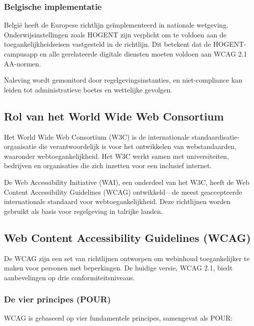 \subsubsection{Belgische implementatie}

België heeft de Europese richtlijn geïmplementeerd in nationale wetgeving. Onderwijsinstellingen zoals HOGENT zijn verplicht om te voldoen aan de toegankelijkheidseisen vastgesteld in de richtlijn. Dit betekent dat de HOGENT-campusapp en alle gerelateerde digitale diensten moeten voldoen aan WCAG 2.1 AA-normen. \autocite{BelgianWebAccessibility2025, Vlaanderen_WCAG_nodate}

Naleving wordt gemonitord door regelgevingsinstanties, en niet-compliance kan leiden tot administratieve boetes en wettelijke gevolgen.

\subsection{Rol van het World Wide Web Consortium}
\label{subsec:w3c-rol}

Het World Wide Web Consortium (W3C) is de internationale standaardisatie-organisatie die verantwoordelijk is voor het ontwikkelen van webstandaarden, waaronder webtoegankelijkheid. Het W3C werkt samen met universiteiten, bedrijven en organisaties die zich inzetten voor een inclusief internet.

De Web Accessibility Initiative (WAI), een onderdeel van het W3C, heeft de Web Content Accessibility Guidelines (WCAG) ontwikkeld—de meest geaccepteerde internationale standaard voor webtoegankelijkheid. Deze richtlijnen worden gebruikt als basis voor regelgeving in talrijke landen.

\subsection{Web Content Accessibility Guidelines (WCAG)}
\label{subsec:wcag}

De WCAG zijn een set van richtlijnen ontworpen om webinhoud toegankelijker te maken voor personen met beperkingen. De huidige versie, WCAG 2.1, biedt aanbevelingen op drie conformiteitsniveaus. \autocite{W3CWCAG21}

\subsubsection{De vier principes (POUR)}

WCAG is gebaseerd op vier fundamentele principes, samengevat als POUR: \autocite{W3CWCAG21, Vlaanderen_WCAG_nodate}


